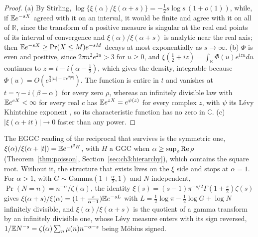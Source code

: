 \begin{proof}
(a) By Stirling, $\log\{\xi(\alpha)/\xi(\alpha+s)\}=-\frac12s\log s\,(1+o(1))$, while, if $\mathbb{E} e^{-sX}$ agreed with it on an interval, it would be finite and agree with it on all of $\mathbb R$, since the transform of a positive measure is singular at the real end points of its interval of convergence \cite{Widder41} and $\xi(\alpha)/\xi(\alpha+s)$ is analytic near the real axis; then $\mathbb{E} e^{-sX}\ge\Pr(X\le M)e^{-sM}$ decays at most exponentially as $s\to\infty$. (b) $\Phi$ is even and positive, since $2\pi n^2e^{2u}>3$ for $u\ge0$, and $\xi(\frac12+iz)=\int_{\mathbb R}\Phi(u)e^{izu}du$ continues to $z=t-i(\alpha-\frac12)$, which gives the density, integrable because $\Phi(u)=O(e^{\frac92|u|-\pi e^{2|u|}})$. The function is entire in $t$ and vanishes at $t=\gamma-i(\beta-\alpha)$ for every zero $\rho$, whereas an infinitely divisible law with $\mathbb{E} e^{cX}<\infty$ for every real $c$ has $\mathbb{E} e^{zX}=e^{\psi(z)}$ for every complex $z$, with $\psi$ its L\'evy Khintchine exponent \cite{Sato99}, so its characteristic function has no zero in $\mathbb C$. (c) $|\xi(\alpha+it)|\to0$ faster than any power.
\end{proof}

The EGGC reading of the reciprocal that survives is the symmetric one, $\xi(\alpha)/\xi(\alpha+|t|)=\mathbb{E} e^{-t^2H}$, with $H$ a GGC when $\alpha\ge\sup_\rho\operatorname{Re}\rho$ (Theorem~\ref{thm:poisson}, Section~\ref{sec:ch3:hierarchy}), which contains the square root. Without it, the structure that exists lives on the $\xi$ side and stops at $\alpha=1$. For $\alpha>1$, with $G\sim\mathrm{Gamma}(1+\frac\alpha2,1)$ and $N$ independent, $\Pr(N=n)=n^{-\alpha}/\zeta(\alpha)$, the identity $\xi(s)=(s-1)\pi^{-s/2}\Gamma(1+\frac s2)\zeta(s)$ gives $\xi(\alpha+s)/\xi(\alpha)=(1+\frac s{\alpha-1})\mathbb{E} e^{-sL}$ with $L=\frac12\log\pi-\frac12\log G+\log N$ infinitely divisible, and $\xi(\alpha)/\xi(\alpha+s)$ is the quotient of a gamma transform by an infinitely divisible one, whose L\'evy measure enters with its sign reversed, $1/\mathbb{E} N^{-s}=\zeta(\alpha)\sum_n\mu(n)n^{-\alpha-s}$ being M\"obius signed.
